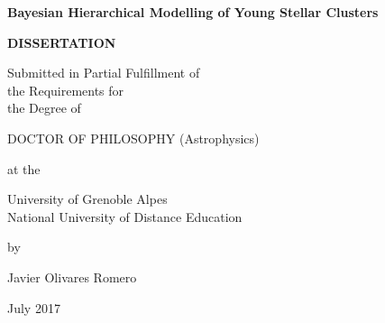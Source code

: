 \documentclass[12pt,a4paper]{report}
\newcommand{\thesistitle}{Bayesian Hierarchical Modelling of Young Stellar Clusters}
\newcommand{\thesisauthor}{Javier Olivares Romero}
\newcommand{\graddate}{July 2017} %
\begin{document}

\thispagestyle{empty}
\begin{center}
{\bfseries 
  {\large\thesistitle}
  \vspace{1in}
  
 {\large {\bf DISSERTATION}}\\
  \vspace{.5in}
  
  \begin{doublespace}
  {\large  
  Submitted in Partial Fulfillment of\\
  the Requirements for\\
  the Degree of\\}
  \end{doublespace}
  \vspace{.5in}
  
  {\large DOCTOR OF PHILOSOPHY (Astrophysics)}\\
  \vspace{.5in}
  
  at the \\
  \vspace{.2in}
  
  {\large
  University of Grenoble Alpes\\
  \vspace{-0.05in}
  National University of Distance Education\
  }
  \vspace{.2in}
  
  by
  \vspace{.5in}

  {\large\thesisauthor}
  \vspace{.5in}

  {\large\graddate}
}

\end{center}

\newpage
\end{document}
